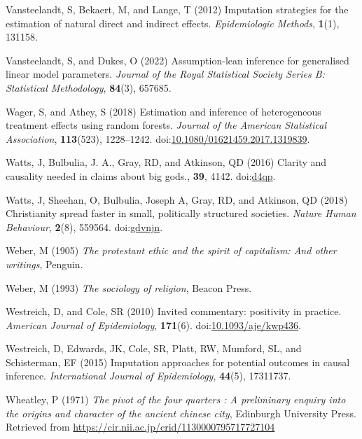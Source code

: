 \documentclass[
  singlecolumn,
  9pt]{article}
\begin{document}
\begin{CSLReferences}
Vansteelandt, S, Bekaert, M, and Lange, T (2012) Imputation strategies
for the estimation of natural direct and indirect effects.
\emph{Epidemiologic Methods}, \textbf{1}(1), 131158.

Vansteelandt, S, and Dukes, O (2022) Assumption-lean inference for
generalised linear model parameters. \emph{Journal of the Royal
Statistical Society Series B: Statistical Methodology}, \textbf{84}(3),
657685.

Wager, S, and Athey, S (2018) Estimation and inference of heterogeneous
treatment effects using random forests. \emph{Journal of the American
Statistical Association}, \textbf{113}(523), 1228--1242.
doi:\href{https://doi.org/10.1080/01621459.2017.1319839}{10.1080/01621459.2017.1319839}.

Watts, J, Bulbulia, J. A., Gray, RD, and Atkinson, QD (2016) Clarity and
causality needed in claims about big gods., \textbf{39}, 4142.
doi:\href{https://doi.org/d4qp}{d4qp}.

Watts, J, Sheehan, O, Bulbulia, Joseph A, Gray, RD, and Atkinson, QD
(2018) Christianity spread faster in small, politically structured
societies. \emph{Nature Human Behaviour}, \textbf{2}(8), 559564.
doi:\href{https://doi.org/gdvnjn}{gdvnjn}.

Weber, M (1905) \emph{The protestant ethic and the spirit of capitalism:
And other writings}, Penguin.

Weber, M (1993) \emph{The sociology of religion}, Beacon Press.

Westreich, D, and Cole, SR (2010) Invited commentary: positivity in
practice. \emph{American Journal of Epidemiology}, \textbf{171}(6).
doi:\href{https://doi.org/10.1093/aje/kwp436}{10.1093/aje/kwp436}.

Westreich, D, Edwards, JK, Cole, SR, Platt, RW, Mumford, SL, and
Schisterman, EF (2015) Imputation approaches for potential outcomes in
causal inference. \emph{International Journal of Epidemiology},
\textbf{44}(5), 17311737.

Wheatley, P (1971) \emph{The pivot of the four quarters : A preliminary
enquiry into the origins and character of the ancient chinese city},
Edinburgh University Press. Retrieved from
\url{https://cir.nii.ac.jp/crid/1130000795717727104}


\end{CSLReferences}
\end{document}

